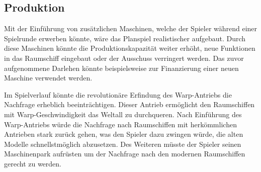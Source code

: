 \subsection{Produktion}
\label{sec:fazit-spielverlauf-produktion}

Mit der Einführung von zusätzlichen Maschinen, welche der Spieler während einer Spielrunde erwerben könnte, wäre das Planspiel realistischer aufgebaut. Durch diese Maschinen könnte die Produktionskapazität weiter erhöht, neue Funktionen in das Raumschiff eingebaut oder der Ausschuss verringert werden. Das zuvor aufgenommene Darlehen könnte beispielsweise zur Finanzierung einer neuen Maschine verwendet werden. 

Im Spielverlauf könnte die revolutionäre Erfindung des Warp-Antriebs die Nachfrage erheblich beeinträchtigen. Dieser Antrieb ermöglicht den Raumschiffen mit Warp-Geschwindigkeit das Weltall zu durchqueren. Nach Einführung des Warp-Antriebs würde die Nachfrage nach Raumschiffen mit herkömmlichen Antrieben stark zurück gehen, was den Spieler dazu zwingen würde, die alten Modelle schnellstmöglich abzusetzen. Des Weiteren müsste der Spieler seinen Maschinenpark aufrüsten um der Nachfrage nach den modernen Raumschiffen gerecht zu werden.